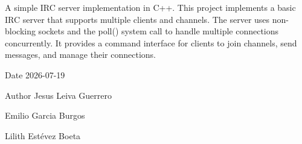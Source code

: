 A simple IRC server implementation in C++. This project implements a basic IRC server that supports multiple clients and channels. The server uses non-\/blocking sockets and the {\ttfamily poll()} system call to handle multiple connections concurrently. It provides a command interface for clients to join channels, send messages, and manage their connections.

\begin{DoxyDate}{Date}
2026-\/07-\/19 
\end{DoxyDate}
\begin{DoxyAuthor}{Author}
Jesus Leiva Guerrero 

Emilio Garcia Burgos 

Lilith Estévez Boeta 
\end{DoxyAuthor}

